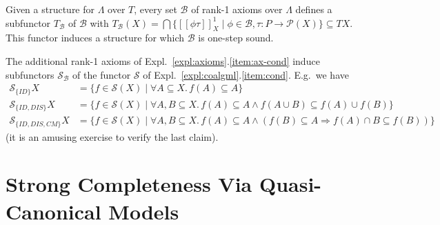 \documentclass[proceedings]{stacs}
\theoremstyle{definition}
\theoremstyle{plain}
\newcommand{\mi}[1]{\mathit{#1}}
\newcommand{\Pow}{\mathcal{P}}
\newcommand{\impl}{\Rightarrow}
\newcommand{\Sem}[1]{{[\![#1]\!]}}
\renewcommand{\conj}{\wedge}
\newcommand{\CB}{\mathcal{B}}
\newcommand{\Sel}{\mathcal{S}}
\begin{document}
Given a structure for $\Lambda$ over $T$, every set $\CB$ of rank-1
axioms over $\Lambda$ defines a subfunctor $T_\CB$ of $\CB$ with
$T_\CB(X)=\bigcap\{\Sem{\phi\tau}^1_X\mid\phi\in\CB,\tau:P\to\Pow(X)\}\subseteq
TX$. This functor induces a structure for which $\CB$ is one-step
sound.
\begin{exa}\label{expl:subfunctors}
  The additional rank-1 axioms of
  Expl.~\ref{expl:axioms}.\ref{item:ax-cond} induce subfunctors
  $\Sel_\CB$ of the functor $\Sel$ of
  Expl.~\ref{expl:coalgml}.\ref{item:cond}. E.g.\ we have
  \begin{align*}
    \Sel_{\{\mi{ID}\}}X&=\{f\in\Sel(X)\mid \forall A\subseteq X.\,
    f(A)\subseteq A\}\\
    \Sel_{\{\mi{ID,DIS}\}}X&=\{f\in\Sel(X)\mid \forall A,B\subseteq X.\,
    f(A)\subseteq A \conj f(A\cup B)\subseteq
    f(A)\cup f(B) \}\\
    \Sel_{\{\mi{ID,DIS,CM}\}}X&=
    \{f\in\Sel(X)\mid \forall A,B\subseteq X.\,
    f(A)\subseteq A \conj
    (f(B)\subseteq A \impl f(A)\cap B\subseteq f(B))\}
\end{align*}
(it is an amusing exercise to verify the last claim).
\end{exa}

\section{Strong Completeness Via Quasi-Canonical Models}
\end{document}
